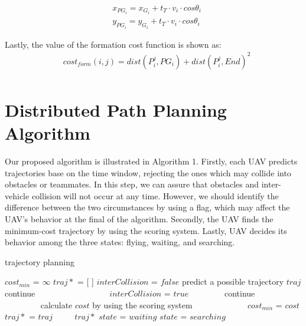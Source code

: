 \begin{equation}
\begin{aligned}
& x_{PG_{i}} = x_{G_{i}} + t_{T}\cdot v_{i}\cdot cos\theta_{i} \\
& y_{PG_{i}} = y_{G_{i}} + t_{T}\cdot v_{i}\cdot cos\theta_{i} 
\end{aligned}
\end{equation}

Lastly, the value of the formation cost function is shown as:
\begin{equation}
\begin{aligned}
& cost_{form}(i, j) = dist(P^{j}_{i}, PG_{i}) + dist(P^{j}_{i}, End)^2 \\
\end{aligned}
\end{equation}


\section{Distributed Path Planning Algorithm}
Our proposed algorithm is illustrated in Algorithm 1. Firstly, each UAV predicts trajectories base on the time window, rejecting the ones which may collide into obstacles or teammates. In this step, we can assure that obstacles and inter-vehicle collision will not occur at any time. However, we should identify the difference between the two circumstances by using a flag, which may affect the UAV's behavior at the final of the algorithm. Secondly, the UAV finds the minimum-cost trajectory by using the scoring system. Lastly, UAV decides its behavior among the three states: flying, waiting, and searching.

\begin{algorithm}[htbp] 
\caption{trajectory planning}
\begin{algorithmic}[1]
\State $cost_{min}$ = $\infty$
\State$traj*$ = [ ]
\State $interCollision$ = $false$
        \State predict a possible trajectory $traj$
    　　　　\State continue
    　　\EndIf
    　　　　\State $interCollision$ = $true$
    　　　　\State continue
    　　\EndIf
    　　\State calculate $cost$ by using the scoring system 
    　　　　\State $cost_{min}$ = $cost$
    　　　　\State $traj*$ = $traj$
    　　\EndIf
    \EndFor
\EndFor
{}
    \State \Return $traj*$
        \State \Return $state$ = $waiting$
    \EndIf
\EndIf
\State \Return $state$ = $searching$
\end{algorithmic}
\end{algorithm}

